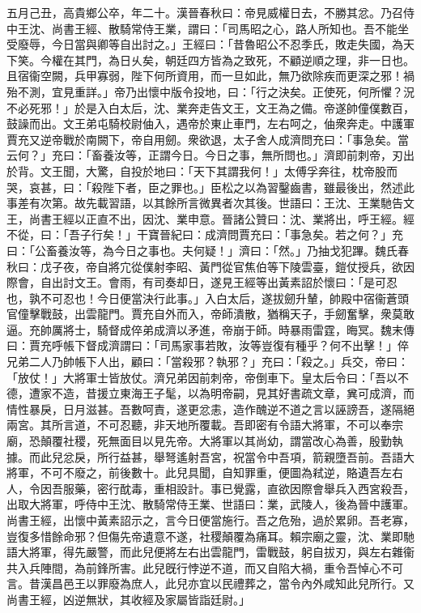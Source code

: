 \begin{pinyinscope}
五月己丑，高貴鄉公卒，年二十。漢晉春秋曰：帝見威權日去，不勝其忿。乃召侍中王沈、尚書王經、散騎常侍王業，謂曰：「司馬昭之心，路人所知也。吾不能坐受廢辱，今日當與卿等自出討之。」王經曰：「昔魯昭公不忍季氏，敗走失國，為天下笑。今權在其門，為日乆矣，朝廷四方皆為之致死，不顧逆順之理，非一日也。且宿衞空闕，兵甲寡弱，陛下何所資用，而一旦如此，無乃欲除疾而更深之邪！禍殆不測，宜見重詳。」帝乃出懷中版令投地，曰：「行之決矣。正使死，何所懼？況不必死邪！」於是入白太后，沈、業奔走告文王，文王為之備。帝遂帥僮僕數百，鼓譟而出。文王弟屯騎校尉伷入，遇帝於東止車門，左右呵之，伷衆奔走。中護軍賈充又逆帝戰於南闕下，帝自用劒。衆欲退，太子舍人成濟問充曰：「事急矣。當云何？」充曰：「畜養汝等，正謂今日。今日之事，無所問也。」濟即前刺帝，刃出於背。文王聞，大驚，自投於地曰：「天下其謂我何！」太傅孚奔往，枕帝股而哭，哀甚，曰：「殺陛下者，臣之罪也。」臣松之以為習鑿齒書，雖最後出，然述此事差有次第。故先載習語，以其餘所言微異者次其後。世語曰：王沈、王業馳告文王，尚書王經以正直不出，因沈、業申意。晉諸公贊曰：沈、業將出，呼王經。經不從，曰：「吾子行矣！」干寶晉紀曰：成濟問賈充曰：「事急矣。若之何？」充曰：「公畜養汝等，為今日之事也。夫何疑！」濟曰：「然。」乃抽戈犯蹕。魏氏春秋曰：戊子夜，帝自將宂從僕射李昭、黃門從官焦伯等下陵雲臺，鎧仗授兵，欲因際會，自出討文王。會雨，有司奏却日，遂見王經等出黃素詔於懷曰：「是可忍也，孰不可忍也！今日便當決行此事。」入白太后，遂拔劒升輦，帥殿中宿衞蒼頭官僮擊戰鼓，出雲龍門。賈充自外而入，帝師潰散，猶稱天子，手劒奮擊，衆莫敢逼。充帥厲將士，騎督成倅弟成濟以矛進，帝崩于師。時暴雨雷霆，晦冥。魏末傳曰：賈充呼帳下督成濟謂曰：「司馬家事若敗，汝等豈復有種乎？何不出擊！」倅兄弟二人乃帥帳下人出，顧曰：「當殺邪？執邪？」充曰：「殺之。」兵交，帝曰：「放仗！」大將軍士皆放仗。濟兄弟因前刺帝，帝倒車下。皇太后令曰：「吾以不德，遭家不造，昔援立東海王子髦，以為明帝嗣，見其好書疏文章，兾可成濟，而情性暴戾，日月滋甚。吾數呵責，遂更忿恚，造作醜逆不道之言以誣謗吾，遂隔絕兩宮。其所言道，不可忍聽，非天地所覆載。吾即密有令語大將軍，不可以奉宗廟，恐顛覆社稷，死無面目以見先帝。大將軍以其尚幼，謂當改心為善，殷勤執據。而此兒忿戾，所行益甚，舉弩遙射吾宮，祝當令中吾項，箭親墮吾前。吾語大將軍，不可不廢之，前後數十。此兒具聞，自知罪重，便圖為弒逆，賂遺吾左右人，令因吾服藥，密行酖毒，重相設計。事已覺露，直欲因際會舉兵入西宮殺吾，出取大將軍，呼侍中王沈、散騎常侍王業、世語曰：業，武陵人，後為晉中護軍。尚書王經，出懷中黃素詔示之，言今日便當施行。吾之危殆，過於累卵。吾老寡，豈復多惜餘命邪？但傷先帝遺意不遂，社稷顛覆為痛耳。賴宗廟之靈，沈、業即馳語大將軍，得先嚴警，而此兒便將左右出雲龍門，雷戰鼓，躬自拔刃，與左右雜衞共入兵陣間，為前鋒所害。此兒旣行悖逆不道，而又自陷大禍，重令吾悼心不可言。昔漢昌邑王以罪廢為庶人，此兒亦宜以民禮葬之，當令內外咸知此兒所行。又尚書王經，凶逆無狀，其收經及家屬皆詣廷尉。」


\end{pinyinscope}
